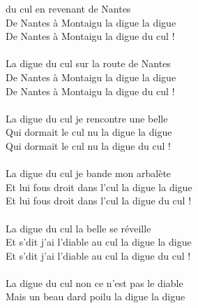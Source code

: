 %
 du cul en revenant de Nantes ~~~~\bissimple
\\De Nantes à Montaigu la digue la digue
\\De Nantes à Montaigu la digue du cul !
\\\\La digue du cul sur la route de Nantes  ~\bissimple
\\De Nantes à Montaigu la digue la digue
\\De Nantes à Montaigu la digue du cul !
\\\\La digue du cul je rencontre une belle ~\bissimple
\\Qui dormait le cul nu la digue la digue
\\Qui dormait le cul nu la digue du cul !
\\\\La digue du cul je bande mon arbalète  ~~~~~~\bissimple
\\Et lui fous droit dans l'cul la digue la digue
\\Et lui fous droit dans l'cul la digue du cul !
\\\\La digue du cul la belle se réveille  ~~~~~~~~~~~~\bissimple
\\Et s'dit j'ai l'diable au cul la digue la digue
\\Et s'dit j'ai l'diable au cul la digue du cul !
\\\\La digue du cul non ce n'est pas le diable  ~\bissimple
\\Mais un beau dard poilu la digue la digue
